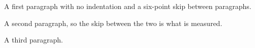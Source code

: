 \documentclass{article}
\begin{document}
A first paragraph with no indentation and a six-point skip between paragraphs.

A second paragraph, so the skip between the two is what is measured.

A third paragraph.
\end{document}
